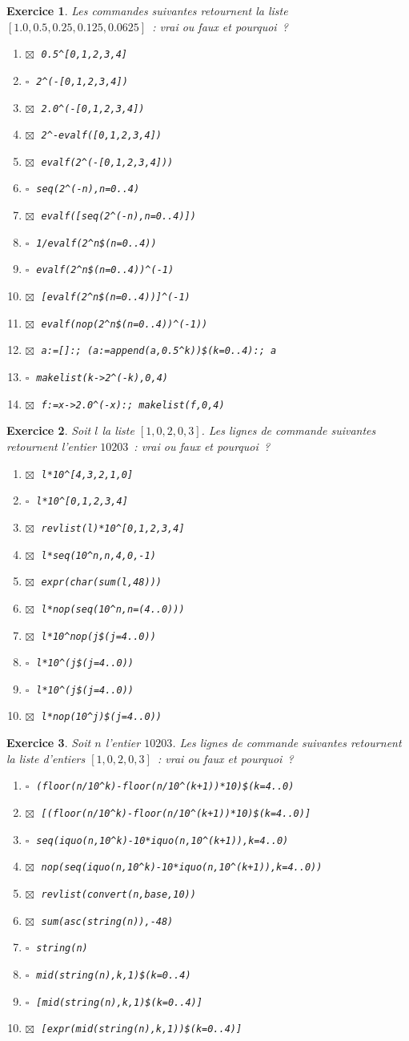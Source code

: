 \documentclass{article}
\newcommand{\faux}{$\square\;$}
\newcommand{\vrai}{$\boxtimes\;$}
\newcommand{\itemf}{\item\faux}
\newcommand{\itemvv}{\item\vrai}
\newtheorem{exo}{Exercice}[section]
\begin{document}
\begin{giacjshere}
\begin{exo}{\rm
Les commandes suivantes retournent la liste
$[1.0,0.5,0.25,0.125,0.0625]$~: 
vrai ou faux et pourquoi~?
\begin{enumerate}
\itemvv
\verb|0.5^[0,1,2,3,4]|
\itemf
\verb|2^(-[0,1,2,3,4])|
\itemvv
\verb|2.0^(-[0,1,2,3,4])|
\itemvv
\verb|2^-evalf([0,1,2,3,4])|
\itemvv
\verb|evalf(2^(-[0,1,2,3,4]))|
\itemf
\verb|seq(2^(-n),n=0..4)|
\itemvv
\verb|evalf([seq(2^(-n),n=0..4)])|
\itemf
\verb|1/evalf(2^n$(n=0..4))|
\itemf
\verb|evalf(2^n$(n=0..4))^(-1)|
\itemvv
\verb|[evalf(2^n$(n=0..4))]^(-1)|
\itemvv
\verb|evalf(nop(2^n$(n=0..4))^(-1))|
\itemvv
\verb|a:=[]:; (a:=append(a,0.5^k))$(k=0..4):; a|
\itemf
\verb|makelist(k->2^(-k),0,4)|
\itemvv
\verb|f:=x->2.0^(-x):; makelist(f,0,4)|
\end{enumerate}
}\end{exo}
\begin{exo}{\rm
Soit $l$ la liste $[1,0,2,0,3]$. Les lignes de commande 
suivantes retournent l'entier $10203$~: vrai ou faux et pourquoi~? 
\begin{enumerate}
\itemvv
\verb|l*10^[4,3,2,1,0]|
\itemf
\verb|l*10^[0,1,2,3,4]|
\itemvv
\verb|revlist(l)*10^[0,1,2,3,4]|
\itemvv
\verb|l*seq(10^n,n,4,0,-1)|
\itemvv
\verb|expr(char(sum(l,48)))|
\itemvv
\verb|l*nop(seq(10^n,n=(4..0)))|
\itemvv
\verb|l*10^nop(j$(j=4..0))|
\itemf
\verb|l*10^(j$(j=4..0))|
\itemf
\verb|l*10^(j$(j=4..0))|
\itemvv
\verb|l*nop(10^j)$(j=4..0))|
\end{enumerate}
}\end{exo}
\begin{exo}{\rm
Soit $n$ l'entier $10203$.
Les lignes de commande suivantes retournent la
liste d'entiers $[1,0,2,0,3]$~: 
vrai ou faux et pourquoi~? 
\begin{enumerate}
\itemf
\verb|(floor(n/10^k)-floor(n/10^(k+1))*10)$(k=4..0)|
\itemvv
\verb|[(floor(n/10^k)-floor(n/10^(k+1))*10)$(k=4..0)]|
\itemf
\verb|seq(iquo(n,10^k)-10*iquo(n,10^(k+1)),k=4..0)|
\itemvv
\verb|nop(seq(iquo(n,10^k)-10*iquo(n,10^(k+1)),k=4..0))|
\itemvv
\verb|revlist(convert(n,base,10))|
\itemvv
\verb|sum(asc(string(n)),-48)|
\itemf
\verb|string(n)|
\itemf
\verb|mid(string(n),k,1)$(k=0..4)|
\itemf
\verb|[mid(string(n),k,1)$(k=0..4)]|
\itemvv
\verb|[expr(mid(string(n),k,1))$(k=0..4)]|
\end{enumerate}
}\end{exo}

\end{giacjshere}
\end{document}

